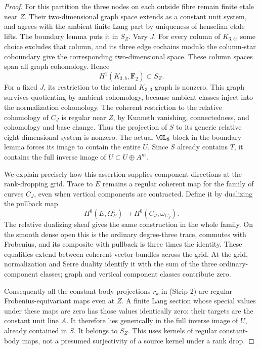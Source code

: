 \begin{proof}
For this partition the three nodes on each outside fibre remain
finite etale near $Z$. Their two-dimensional graph space extends
as a constant unit system, and agrees with the ambient finite
Lang part by uniqueness of henselian etale lifts. The boundary
lemma puts it in $S_Z$. Vary $J$. For every column of $K_{3,b}$,
some choice excludes that column, and its three edge cochains
modulo the column-star coboundary give the corresponding
two-dimensional space. These column spaces span all graph
cohomology. Hence
\[
                         H^1(K_{3,b},\mathbf F_2)\subset S_Z.
                                                               \tag{Strip-4}
\]
For a fixed $J$, its restriction to the internal $K_{3,3}$ graph
is nonzero. This graph survives quotienting by ambient cohomology,
because ambient classes inject into the normalization cohomology.
The coherent restriction to the relative cohomology of $C_J$
is regular near $Z$, by Kunneth vanishing, connectedness, and
cohomology and base change. Thus the projection of $S$ to its
generic relative eight-dimensional system is nonzero. The actual
$\GL_8$ block in the boundary lemma forces its image to contain
the entire $U$. Since $S$ already contains $T$, it contains the
full inverse image of $U\subset U\oplus A^m$.

We explain precisely how this assertion supplies component
directions at the rank-dropping grid. Trace to $E$ remains a
regular coherent map for the family of curves $C_J$, even when
vertical components are contracted. Define it by dualizing the
pullback map
\[
               H^0(E,\Omega_E^1)\longrightarrow H^0(C_J,\omega_{C_J}).
\]
The relative dualizing sheaf gives the same construction in the
whole family. On the smooth dense open this is the ordinary
degree-three trace, commutes with Frobenius, and its composite
with pullback is three times the identity. These equalities
extend between coherent vector bundles across the grid. At the
grid, normalization and Serre duality identify it with the sum
of the three ordinary-component classes; graph and vertical
component classes contribute zero.

Consequently all the constant-body projections $r_k$ in
(Strip-2) are regular Frobenius-equivariant maps even at $Z$.
A finite Lang section whose special values under these maps
are zero has those values identically zero: their targets are
the constant unit line $A$. It therefore lies generically in
the full inverse image of $U$, already contained in $S$.
It belongs to $S_Z$. This uses kernels of regular constant-body
maps, not a presumed surjectivity of a source kernel under a
rank drop.


\end{proof}
